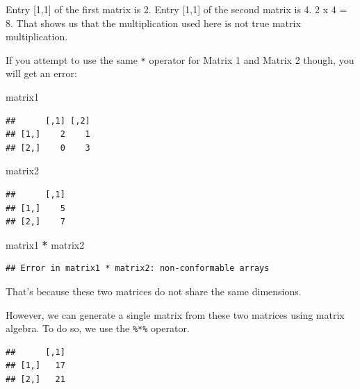 \documentclass[
]{book}
\newenvironment{Shaded}{\begin{snugshade}}{\end{snugshade}}
\newcommand{\NormalTok}[1]{#1}
\newcommand{\OperatorTok}[1]{\textcolor[rgb]{0.81,0.36,0.00}{\textbf{#1}}}
\newcommand{\StringTok}[1]{\textcolor[rgb]{0.31,0.60,0.02}{#1}}
\begin{document}
Entry {[}1,1{]} of the first matrix is 2. Entry {[}1,1{]} of the second matrix is 4. 2 x 4 = 8. That shows us that the multiplication used here is not true matrix multiplication.

If you attempt to use the same \texttt{*} operator for Matrix 1 and Matrix 2 though, you will get an error:

\begin{Shaded}
\begin{Highlighting}[]
\NormalTok{matrix1}
\end{Highlighting}
\end{Shaded}

\begin{verbatim}
##      [,1] [,2]
## [1,]    2    1
## [2,]    0    3
\end{verbatim}

\begin{Shaded}
\begin{Highlighting}[]
\NormalTok{matrix2}
\end{Highlighting}
\end{Shaded}

\begin{verbatim}
##      [,1]
## [1,]    5
## [2,]    7
\end{verbatim}

\begin{Shaded}
\begin{Highlighting}[]
\NormalTok{matrix1 }\OperatorTok{*}\StringTok{ }\NormalTok{matrix2}
\end{Highlighting}
\end{Shaded}

\begin{verbatim}
## Error in matrix1 * matrix2: non-conformable arrays
\end{verbatim}

That's because these two matrices do not share the same dimensions.

However, we can generate a single matrix from these two matrices using matrix algebra. To do so, we use the \texttt{\%*\%} operator.

\begin{Shaded}
\end{Shaded}

\begin{verbatim}
##      [,1]
## [1,]   17
## [2,]   21
\end{verbatim}
\end{document}
